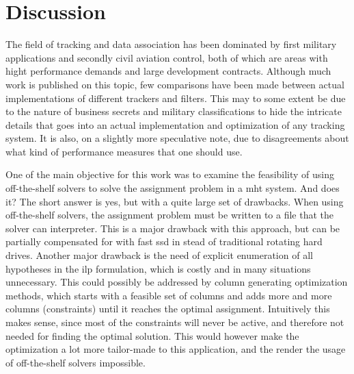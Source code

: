 \section{Discussion}
\label{sec:discussion}
The field of tracking and data association has been dominated by first military applications and secondly civil aviation control, both of which are areas with hight performance demands and large development contracts. Although much work is published on this topic, few comparisons have been made between actual implementations of different trackers and filters. This may to some extent be due to the nature of business secrets and military classifications to hide the intricate details that goes into an actual implementation and optimization of any tracking system. It is also, on a slightly more speculative note, due to disagreements about what kind of performance measures that one should use. 

One of the main objective for this work was to examine the feasibility of using off-the-shelf solvers to solve the assignment problem in a \gls{mht} system. And does it? The short answer is yes, but with a quite large set of drawbacks. When using off-the-shelf solvers, the assignment problem must be written to a file that the solver can interpreter. This is a major drawback with this approach, but can be partially compensated for with fast \gls{ssd} in stead of traditional rotating hard drives. Another major drawback is the need of explicit enumeration of all hypotheses in the \gls{ilp} formulation, which is costly and in many situations unnecessary. This could possibly be addressed by column generating optimization \cite{Barnhart1998} methods, which starts with a feasible set of columns and adds more and more columns (constraints) until it reaches the optimal assignment. Intuitively this makes sense, since most of the constraints will never be active, and therefore not needed for finding the optimal solution. This would however make the optimization a lot more tailor-made to this application, and the render the usage of off-the-shelf solvers impossible.

